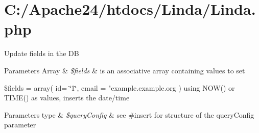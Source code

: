 \hypertarget{_c_1_2_apache24_2htdocs_2_linda_2_linda_8php-example}{}\section{C\+:/\+Apache24/htdocs/\+Linda/\+Linda.\+php}
Update fields in the D\+B


\begin{DoxyParams}[1]{Parameters}
Array & {\em \$fields} & is an associative array containing values to set\\
\hline
\end{DoxyParams}
\$fields = array( id= \char`\"{}1\char`\"{}, email = "example.\+example.\+org ) using N\+O\+W() or T\+I\+M\+E() as values, inserts the date/time 
\begin{DoxyParams}[1]{Parameters}
type & {\em \$query\+Config} & see \#insert for structure of the query\+Config parameter\\
\hline
\end{DoxyParams}

